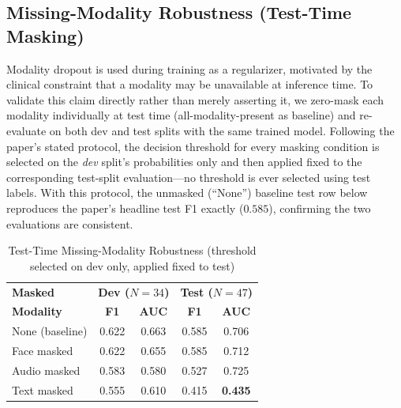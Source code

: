 \documentclass[5p,twocolumn]{elsarticle}
\begin{document}
\subsection{Missing-Modality Robustness (Test-Time Masking)}
\label{sec:robustness}

Modality dropout is used during training as a regularizer, motivated
by the clinical constraint that a modality may be unavailable at
inference time. To validate this claim directly rather than merely
asserting it, we zero-mask each modality individually at test time
(all-modality-present as baseline) and re-evaluate on both dev and
test splits with the same trained model. Following the paper's stated
protocol, the decision threshold for every masking condition is
selected on the \emph{dev} split's probabilities only and then applied
fixed to the corresponding test-split evaluation---no threshold is
ever selected using test labels. With this protocol, the unmasked
(``None'') baseline test row below reproduces the paper's headline
test F1 exactly ($0.585$), confirming the two evaluations are
consistent.

\begin{table}[t]
\centering
\renewcommand{\arraystretch}{1.15}
\caption{Test-Time Missing-Modality Robustness (threshold selected on
dev only, applied fixed to test)}
\label{tab:robustness}
\begin{tabular}{lcccc}
\toprule
\textbf{Masked} & \multicolumn{2}{c}{\textbf{Dev ($N{=}34$)}}
  & \multicolumn{2}{c}{\textbf{Test ($N{=}47$)}} \\
\textbf{Modality} & \textbf{F1} & \textbf{AUC} & \textbf{F1} & \textbf{AUC} \\
\midrule
None (baseline)  & 0.622 & 0.663 & 0.585 & 0.706 \\
Face masked      & 0.622 & 0.655 & 0.585 & 0.712 \\
Audio masked     & 0.583 & 0.580 & 0.527 & 0.725 \\
Text masked      & 0.555 & 0.610 & 0.415 & \textbf{0.435} \\
\bottomrule
\end{tabular}
\end{table}
\end{document}
